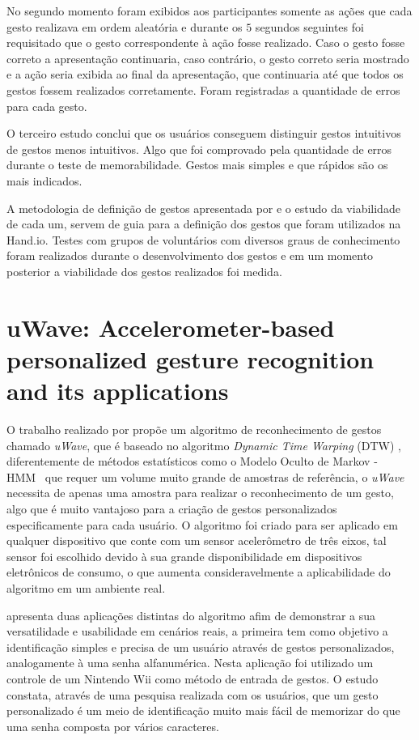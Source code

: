 No segundo momento foram exibidos aos participantes somente as ações que cada gesto realizava em ordem aleatória e durante os $5$ segundos seguintes foi requisitado que o gesto correspondente à ação fosse realizado. Caso o gesto fosse correto a apresentação continuaria, caso contrário, o gesto correto seria mostrado e a ação seria exibida ao final da apresentação, que continuaria até que todos os gestos fossem realizados corretamente. Foram registradas a quantidade de erros para cada gesto.

O terceiro estudo conclui que os usuários conseguem distinguir gestos intuitivos de gestos menos intuitivos. Algo que foi comprovado pela quantidade de erros durante o teste de memorabilidade. Gestos mais simples e que rápidos são os mais indicados.

A metodologia de definição de gestos apresentada por  e o estudo da viabilidade de cada um, servem de guia para a definição dos gestos que foram utilizados na Hand.io. Testes com grupos de voluntários com diversos graus de conhecimento foram realizados durante o desenvolvimento dos gestos e em um momento posterior a viabilidade dos gestos realizados foi medida.



\section{uWave: Accelerometer-based personalized gesture recognition and its applications}
\label{cor:uwave}

O trabalho realizado por  propõe um algoritmo de reconhecimento de gestos chamado \textit{uWave}, que é baseado no algoritmo \textit{Dynamic Time Warping} (DTW) \cite{dtw}, diferentemente de métodos estatísticos como o Modelo Oculto de Markov - HMM~\cite{hmm:1989} que requer um volume muito grande de amostras de referência, o \textit{uWave} necessita de apenas uma amostra para realizar o reconhecimento de um gesto, algo que é muito vantajoso para a criação de gestos personalizados especificamente para cada usuário. O algoritmo foi criado para ser aplicado em qualquer dispositivo que conte com um sensor acelerômetro de três eixos, tal sensor foi escolhido devido à sua grande disponibilidade em dispositivos eletrônicos de consumo, o que aumenta consideravelmente a aplicabilidade do algoritmo em um ambiente real.

 apresenta duas aplicações distintas do algoritmo afim de demonstrar a sua versatilidade e usabilidade em cenários reais, a primeira tem como objetivo a identificação simples e precisa de um usuário através de gestos personalizados, analogamente à uma senha alfanumérica. Nesta aplicação foi utilizado um controle de um Nintendo Wii \cite{wii} como método de entrada de gestos. O estudo constata, através de uma pesquisa realizada com os usuários, que um gesto personalizado é um meio de identificação muito mais fácil de memorizar do que uma senha composta por vários caracteres. 

